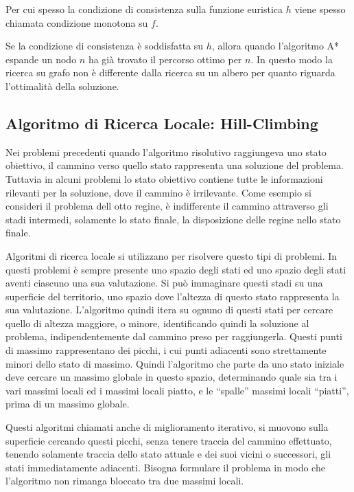 \documentclass{article}
\numberwithin{equation}{subsection}
\begin{document}
Per cui spesso la condizione di consistenza sulla funzione euristica $h$ viene spesso chiamata 
condizione monotona su $f$. 

Se la condizione di consistenza è soddisfatta su $h$, allora quando l'algoritmo A* espande un nodo 
$n$ ha già trovato il percorso ottimo per $n$. In questo modo la ricerca su grafo non è 
differente dalla ricerca su un albero per quanto riguarda l'ottimalità della soluzione. 

\subsection{Algoritmo di Ricerca Locale: Hill-Climbing}


Nei problemi precedenti quando l'algoritmo risolutivo raggiungeva uno stato obiettivo, il cammino verso quello stato rappresenta una soluzione 
del problema. Tuttavia in alcuni problemi lo stato obiettivo contiene tutte le informazioni rilevanti per la soluzione, dove il cammino è 
irrilevante. Come esempio si consideri il problema dell otto regine, è indifferente il cammino attraverso gli stadi intermedi, solamente lo 
stato finale, la disposizione delle regine nello stato finale. 

Algoritmi di ricerca locale si utilizzano per risolvere questo tipi di problemi. In questi problemi è sempre presente uno spazio degli stati 
ed uno spazio degli stati aventi ciascuno una sua valutazione. Si può immaginare questi stadi su una superficie del territorio, uno spazio dove l'altezza 
di questo stato rappresenta la sua valutazione. L'algoritmo quindi itera su ognuno di questi stati per cercare quello di altezza maggiore, o minore, identificando 
quindi la soluzione al problema, indipendentemente dal cammino preso per raggiungerla. Questi punti di massimo rappresentano dei picchi, i cui punti adiacenti sono 
strettamente minori dello stato di massimo. Quindi l'algoritmo che parte da uno stato iniziale deve cercare un massimo globale in questo spazio, determinando quale sia 
tra i vari massimi locali ed i massimi locali piatto, e le ``spalle'' massimi locali ``piatti'', prima di un massimo globale. 


Questi algoritmi chiamati anche di miglioramento iterativo, si muovono sulla superficie cercando questi picchi, senza tenere traccia del cammino effettuato, tenendo 
solamente traccia dello stato attuale e dei suoi vicini o successori, gli stati immediatamente adiacenti. 
Bisogna formulare il problema in modo che l'algoritmo non rimanga bloccato tra due massimi locali. 
\end{document}
